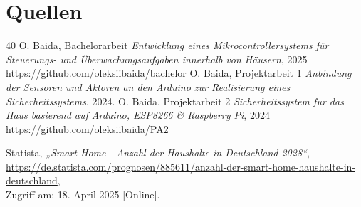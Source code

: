 \documentclass[12pt, letterpaper]{article}
\begin{document}
\section{Quellen}
\begin{thebibliography}{40}
  O. Baida, Bachelorarbeit \textit{Entwicklung eines Mikrocontrollersystems für Steuerungs- und Überwachungsaufgaben innerhalb von Häusern}, 2025 \\ \url{https://github.com/oleksiibaida/bachelor}
  O. Baida, Projektarbeit 1 \textit{Anbindung der Sensoren und Aktoren an den Arduino zur Realisierung eines Sicherheitssystems}, 2024.
  O. Baida, Projektarbeit 2 \textit{Sicherheitssystem fur das Haus basierend auf Arduino, ESP8266 \& Raspberry Pi}, 2024 \url{https://github.com/oleksiibaida/PA2}
  
  Statista, \textit{„Smart Home - Anzahl der Haushalte in Deutschland 2028“},\\
  \href{https://de.statista.com/prognosen/885611/anzahl-der-smart-home-haushalte-in-deutschland}{https://de.statista.com/prognosen/885611/anzahl-der-smart-home-haushalte-in-deutschland}, \\ Zugriff am: 18. April 2025 [Online].
  

\end{thebibliography}
\end{document}

